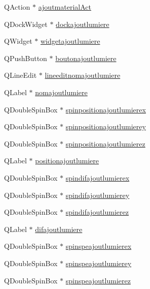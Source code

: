 \begin{DoxyCompactItemize}
\item 
Q\+Action $\ast$ \hyperlink{class_main_window_ae531eca2b9941c7f260f466edd97790e}{ajoutmaterial\+Act}
\item 
Q\+Dock\+Widget $\ast$ \hyperlink{class_main_window_a391dd00592f215079a80db989f24266e}{dockajoutlumiere}
\item 
Q\+Widget $\ast$ \hyperlink{class_main_window_a9e2c8a96b09dbbfaa041531420603b9e}{widgetajoutlumiere}
\item 
Q\+Push\+Button $\ast$ \hyperlink{class_main_window_a4f7a42439a3d1dbc5213e5d2282f5ab0}{boutonajoutlumiere}
\item 
Q\+Line\+Edit $\ast$ \hyperlink{class_main_window_a88ef14a32e7bd0694d8c970b700588c8}{lineeditnomajoutlumiere}
\item 
Q\+Label $\ast$ \hyperlink{class_main_window_ad38c142eee23820d2d4c87217ea3558a}{nomajoutlumiere}
\item 
Q\+Double\+Spin\+Box $\ast$ \hyperlink{class_main_window_a5286af2240735027e43e96856889ba2d}{spinpositionajoutlumierex}
\item 
Q\+Double\+Spin\+Box $\ast$ \hyperlink{class_main_window_af8f989d61672591976f45a3857bd4088}{spinpositionajoutlumierey}
\item 
Q\+Double\+Spin\+Box $\ast$ \hyperlink{class_main_window_a190e482131a28865d5cb0956a1149272}{spinpositionajoutlumierez}
\item 
Q\+Label $\ast$ \hyperlink{class_main_window_a3c50fe103c1d0f1278737bced7e2e452}{positionajoutlumiere}
\item 
Q\+Double\+Spin\+Box $\ast$ \hyperlink{class_main_window_a0c740f449736ce6c303b0675f954f050}{spindifajoutlumierex}
\item 
Q\+Double\+Spin\+Box $\ast$ \hyperlink{class_main_window_ae03c85b751d4a28e2916e66d82d7e72d}{spindifajoutlumierey}
\item 
Q\+Double\+Spin\+Box $\ast$ \hyperlink{class_main_window_afca1245690133c96c9e182b0b56c6006}{spindifajoutlumierez}
\item 
Q\+Label $\ast$ \hyperlink{class_main_window_a87d3bd68a5f4e2323110804c4111dcc9}{difajoutlumiere}
\item 
Q\+Double\+Spin\+Box $\ast$ \hyperlink{class_main_window_a433afe9bb63e53ccf2253eb39ee6ebd1}{spinspeajoutlumierex}
\item 
Q\+Double\+Spin\+Box $\ast$ \hyperlink{class_main_window_afd72a5b29130fa092fdb6cb9b05f937c}{spinspeajoutlumierey}
\item 
Q\+Double\+Spin\+Box $\ast$ \hyperlink{class_main_window_a69368f55e2df16fac69b4bc9b7b24696}{spinspeajoutlumierez}

\end{DoxyCompactItemize}

